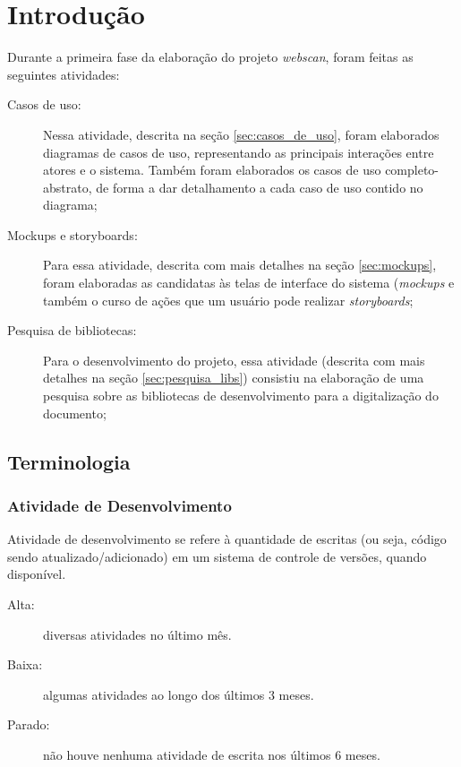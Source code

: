\section{Introdução}
\label{sec:intro}

Durante a primeira fase da elaboração do projeto {\it webscan}, foram feitas as seguintes atividades:

\begin{description}
    \item[Casos de uso: ] Nessa atividade, descrita na seção \ref{sec:casos_de_uso}, foram elaborados diagramas de casos de uso, representando as principais interações entre atores e o sistema. Também foram elaborados os casos de uso completo-abstrato, de forma a dar detalhamento a cada caso de uso contido no diagrama;
    \item[Mockups e storyboards: ] Para essa atividade, descrita com mais detalhes na seção \ref{sec:mockups}, foram elaboradas as candidatas às telas de interface do sistema ({\it mockups} e também o curso de ações que um usuário pode realizar {\it storyboards};
    \item[Pesquisa de bibliotecas: ] Para o desenvolvimento do projeto, essa atividade (descrita com mais detalhes na seção \ref{sec:pesquisa_libs}) consistiu na elaboração de uma pesquisa sobre as bibliotecas de desenvolvimento para a digitalização do documento;
\end{description}

\subsection{Terminologia}

\subsubsection{Atividade de Desenvolvimento}
Atividade de desenvolvimento se refere à quantidade de escritas (ou seja, código sendo atualizado/adicionado) em um sistema de controle de versões, quando disponível.

\begin{description}
    \item[Alta:] diversas atividades no último mês.
    \item[Baixa:] algumas atividades ao longo dos últimos 3 meses.
    \item[Parado:] não houve nenhuma atividade de escrita nos últimos 6 meses.
\end{description}

